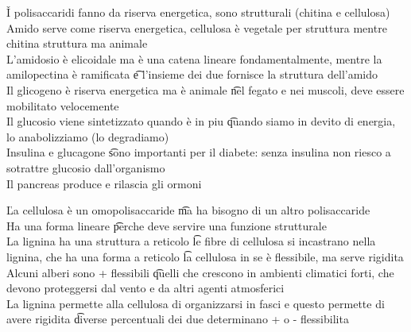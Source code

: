\documentclass[12pt]{article}
\begin{document}
\v

I polisaccaridi fanno da riserva energetica, sono strutturali (chitina e cellulosa) \\
Amido serve come riserva energetica, cellulosa è vegetale per struttura mentre chitina struttura ma animale \\
L'amidosio è elicoidale ma è una catena lineare fondamentalmente, mentre la amilopectina è ramificata \t e l'insieme dei due fornisce la struttura dell'amido \\
Il glicogeno è riserva energetica ma è animale \t nel fegato e nei muscoli, deve essere mobilitato velocemente \\
Il glucosio viene sintetizzato quando è in piu \t quando siamo in devito di energia, lo anabolizziamo (lo degradiamo) \\
Insulina e glucagone \t sono importanti per il diabete: senza insulina non riesco a sotrattre glucosio dall'organismo \\
Il pancreas produce e rilascia gli ormoni

\v

La cellulosa è un omopolisaccaride \t ma ha bisogno di un altro polisaccaride \\
Ha una forma lineare \t perche deve servire una funzione strutturale \\
La lignina ha una struttura a reticolo \t le fibre di cellulosa si incastrano nella lignina, che ha una forma a reticolo \t la cellulosa in se è flessibile, ma serve rigidita \\
Alcuni alberi sono + flessibili \t quelli che crescono in ambienti climatici forti, che devono proteggersi dal vento e da altri agenti atmosferici \\
La lignina permette alla cellulosa di organizzarsi in fasci e questo permette di avere rigidita \t diverse percentuali dei due determinano + o - flessibilita
\end{document}
